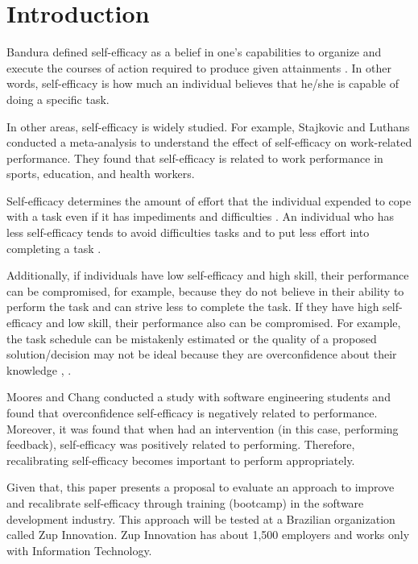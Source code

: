 \documentclass[10pt, conference]{IEEEtran}
\begin{document}
\section{Introduction}

Bandura defined self-efficacy as a belief in one’s capabilities to organize and execute the courses of action required to produce given attainments \cite{bandura1977self}. In other words, self-efficacy is how much an individual believes that he/she is capable of doing a specific task.

In other areas, self-efficacy is widely studied. For example, Stajkovic and Luthans \cite{stajkovic1998self} conducted a meta-analysis to understand the effect of self-efficacy on work-related performance. They found that self-efficacy is related to work performance in sports, education, and health workers.

Self-efficacy determines the amount of effort that the individual expended to cope with a task even if it has impediments and difficulties \cite{bandura1977self}. An individual who has less self-efficacy tends to avoid difficulties tasks and to put less effort into completing a task \cite{artino2012academic}.

Additionally, if individuals have low self-efficacy and high skill, their performance can be compromised, for example, because they do not believe in their ability to perform the task and can strive less to complete the task. If they have high self-efficacy and low skill, their performance also can be compromised. For example, the task schedule can be mistakenly estimated or the quality of a proposed solution/decision may not be ideal because they are overconfidence about their knowledge \cite{vancouver2002two}, \cite{pajares1996self} \cite{schunk2009self}. 

Moores and Chang \cite{moores2009self} conducted a study with software engineering students and found that overconfidence self-efficacy is negatively related to performance. Moreover, it was found that when had an intervention (in this case, performing feedback), self-efficacy was positively related to performing. Therefore, recalibrating self-efficacy becomes important to perform appropriately.

Given that, this paper presents a proposal to evaluate an approach to improve and recalibrate self-efficacy through training (bootcamp) in the software development industry. This approach will be tested at a Brazilian organization called Zup Innovation. Zup Innovation has about 1,500 employers and works only with Information Technology. 
\end{document}
